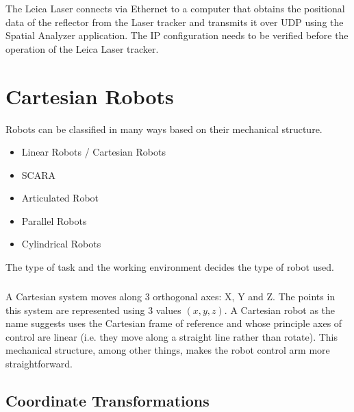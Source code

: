 \documentclass{LTHthesis}
\begin{document}
        The Leica Laser connects via Ethernet to a computer that obtains the positional data of the reflector from the Laser tracker and transmits it over UDP using the Spatial Analyzer application. The IP configuration needs to be verified before the operation of the Leica Laser tracker. 
    \section{Cartesian Robots}\label{cartesian robots}
        Robots can be classified in many ways based on their mechanical structure.
        \begin{itemize}
            \item Linear Robots / Cartesian Robots
            \item SCARA
            \item Articulated Robot
            \item Parallel Robots
            \item Cylindrical Robots
        \end{itemize}
        The type of task and the working environment decides the type of robot used.
        \subparagraph*{}
            A Cartesian system moves along 3 orthogonal axes: X, Y and Z. The points in this system are represented using 3 values $(x,y,z)$. A Cartesian robot as the name suggests uses the Cartesian frame of reference and whose principle axes of control are linear (i.e. they move along a straight line rather than rotate). This mechanical structure, among other things, makes the robot control arm more straightforward.
            \subsection{Coordinate Transformations}
\end{document}
